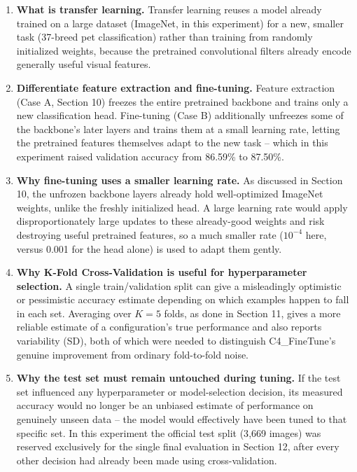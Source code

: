 \documentclass[10pt]{article}
\begin{document}
\begin{enumerate}
\item \textbf{What is transfer learning.}
Transfer learning reuses a model already trained on a large dataset
(ImageNet, in this experiment) for a new, smaller task (37-breed pet
classification) rather than training from randomly initialized weights,
because the pretrained convolutional filters already encode generally
useful visual features.

\item \textbf{Differentiate feature extraction and fine-tuning.}
Feature extraction (Case A, Section 10) freezes the entire pretrained
backbone and trains only a new classification head. Fine-tuning (Case B)
additionally unfreezes some of the backbone's later layers and trains them
at a small learning rate, letting the pretrained features themselves adapt
to the new task -- which in this experiment raised validation accuracy from
86.59\% to 87.50\%.

\item \textbf{Why fine-tuning uses a smaller learning rate.}
As discussed in Section 10, the unfrozen backbone layers already hold
well-optimized ImageNet weights, unlike the freshly initialized head. A
large learning rate would apply disproportionately large updates to these
already-good weights and risk destroying useful pretrained features, so a
much smaller rate ($10^{-4}$ here, versus 0.001 for the head alone) is used
to adapt them gently.

\item \textbf{Why K-Fold Cross-Validation is useful for hyperparameter selection.}
A single train/validation split can give a misleadingly optimistic or
pessimistic accuracy estimate depending on which examples happen to fall
in each set. Averaging over $K=5$ folds, as done in Section 11, gives a
more reliable estimate of a configuration's true performance and also
reports variability (SD), both of which were needed to distinguish
C4\_FineTune's genuine improvement from ordinary fold-to-fold noise.

\item \textbf{Why the test set must remain untouched during tuning.}
If the test set influenced any hyperparameter or model-selection decision,
its measured accuracy would no longer be an unbiased estimate of
performance on genuinely unseen data -- the model would effectively have
been tuned to that specific set. In this experiment the official test
split (3{,}669 images) was reserved exclusively for the single final
evaluation in Section 12, after every other decision had already been made
using cross-validation.


\end{enumerate}
\end{document}
